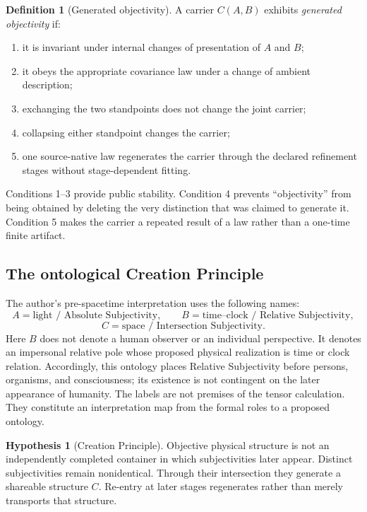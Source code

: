 \documentclass[11pt]{article}
\theoremstyle{definition}
\newtheorem{definition}[theorem]{Definition}
\newtheorem{hypothesis}[theorem]{Hypothesis}
\theoremstyle{remark}
\begin{document}
\begin{definition}[Generated objectivity]\label{def:go}
A carrier $C(A,B)$ exhibits \emph{generated objectivity} if:
\begin{enumerate}
\item it is invariant under internal changes of presentation of $A$ and $B$;
\item it obeys the appropriate covariance law under a change of ambient description;
\item exchanging the two standpoints does not change the joint carrier;
\item collapsing either standpoint changes the carrier;
\item one source-native law regenerates the carrier through the declared refinement stages without stage-dependent fitting.
\end{enumerate}
\end{definition}

Conditions 1--3 provide public stability. Condition 4 prevents ``objectivity'' from being obtained by deleting the very distinction that was claimed to generate it. Condition 5 makes the carrier a repeated result of a law rather than a one-time finite artifact.

\subsection{The ontological Creation Principle}

The author's pre-spacetime interpretation uses the following names:
\[
 A=\text{light / Absolute Subjectivity},\qquad
 B=\text{time--clock / Relative Subjectivity},
\]
\[
 C=\text{space / Intersection Subjectivity}.
\]
Here $B$ does not denote a human observer or an individual perspective. It denotes an impersonal relative pole whose proposed physical realization is time or clock relation. Accordingly, this ontology places Relative Subjectivity before persons, organisms, and consciousness; its existence is not contingent on the later appearance of humanity.
The labels are not premises of the tensor calculation. They constitute an interpretation map from the formal roles to a proposed ontology.

\begin{hypothesis}[Creation Principle]\label{hyp:cp}
Objective physical structure is not an independently completed container in which subjectivities later appear. Distinct subjectivities remain nonidentical. Through their intersection they generate a shareable structure $C$. Re-entry at later stages regenerates rather than merely transports that structure.
\end{hypothesis}
\end{document}

